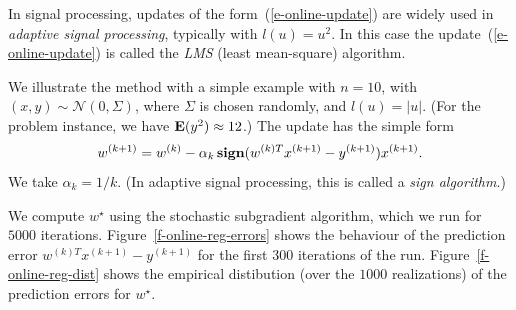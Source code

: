\documentclass[12pt]{article}
\newcommand{\sign}{\mathop{\bf sign}}
\begin{document}
In signal processing, updates of the form~(\ref{e-online-update})
are widely used in \emph{adaptive signal processing}, typically with
$l(u)=u^2$.
In this case the update~(\ref{e-online-update}) is called
the \emph{LMS} (least mean-square) algorithm.

We illustrate the method with a simple example with $n=10$,
with $(x,y) \sim \mathcal N(0,\Sigma)$, where $\Sigma$ is chosen
randomly, and $l(u)=|u|$. (For the problem instance,
we have $\mathop{\bf E{}}( y^2 ) \approx 12$.)
The update has the simple form
\[
w^{(k+1)}=w^{(k)}-\alpha_k
\sign (w^{(k)T}x^{(k+1)}-y^{(k+1)})x^{(k+1)}.
\]
We take $\alpha_k=1/k$.
(In adaptive signal processing, this is called
a \emph{sign algorithm}.)

We compute $w^\star$ using the stochastic subgradient algorithm,
which we run for $5000$ iterations.
Figure~\ref{f-online-reg-errors} shows the behaviour of the
prediction error $w^{(k)T}x^{(k+1)}-y^{(k+1)}$
for the first $300$ iterations of the run.
Figure~\ref{f-online-reg-dist} shows the empirical distibution
(over the $1000$ realizations) of the prediction errors for $w^\star$.
\end{document}
